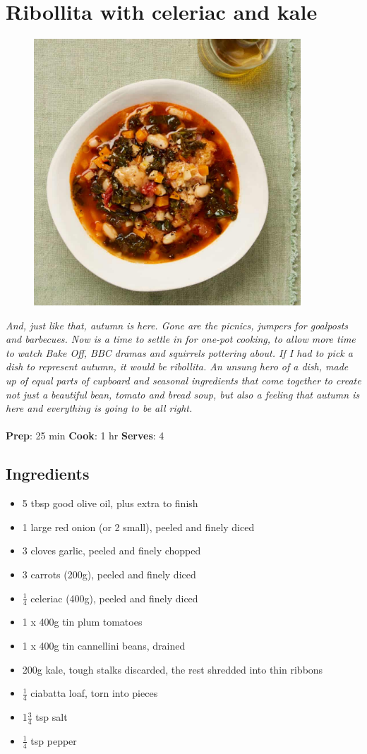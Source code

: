 \documentclass{book}
\begin{document}
\section{Ribollita with celeriac and kale}
\begin{figure}
\centering\includegraphics[width=10cm,height=10cm,keepaspectratio]{Recipe_Pictures/Ribollita_with_celeriac_and_kale.png}
\end{figure}
\emph{And, just like that, autumn is here. Gone are the picnics, jumpers for goalposts and barbecues. Now is a time to settle in for one-pot cooking, to allow more time to watch Bake Off, BBC dramas and squirrels pottering about. If I had to pick a dish to represent autumn, it would be ribollita. An unsung hero of a dish, made up of equal parts of cupboard and seasonal ingredients that come together to create not just a beautiful bean, tomato and bread soup, but also a feeling that autumn is here and everything is going to be all right.}\\\\ 
\textbf{Prep}: 25 min
\textbf{Cook}: 1 hr
\textbf{Serves}: 4
\subsection*{Ingredients}
\begin{itemize}
\item 5 tbsp good olive oil, plus extra to finish
\item 1 large red onion (or 2 small), peeled and finely diced
\item 3 cloves garlic, peeled and finely chopped
\item 3 carrots (200g), peeled and finely diced
\item $\frac{1}{4}$ celeriac (400g), peeled and finely diced
\item 1 x 400g tin plum tomatoes
\item 1 x 400g tin cannellini beans, drained 
\item 200g kale, tough stalks discarded, the rest shredded into thin ribbons
\item $\frac{1}{4}$ ciabatta loaf, torn into pieces
\item 1$\frac{3}{4}$ tsp salt 
\item $\frac{1}{4}$ tsp pepper
\end{itemize}
\end{document}
